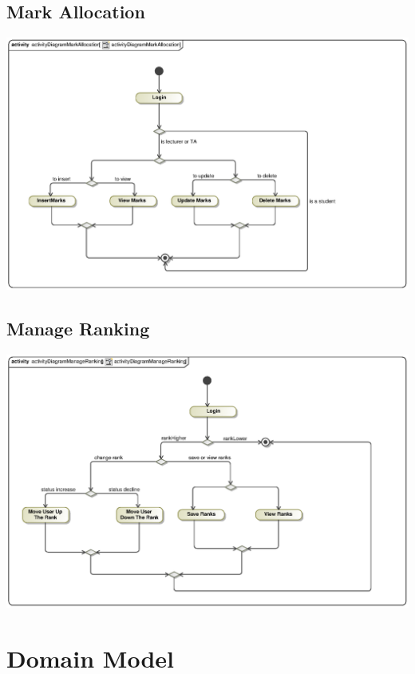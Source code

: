 \documentclass{scrreprt}
\begin{document}
\subsection{Mark Allocation}
\includegraphics[scale=.9]{Kgomotso/graphics/activityDiagramMarkAllocation.eps}\\

\subsection{Manage Ranking}
\includegraphics[scale=.9]{Kgomotso/graphics/activityDiagramManageRanking.eps}\\

\section{Domain Model} 

\end{document}
